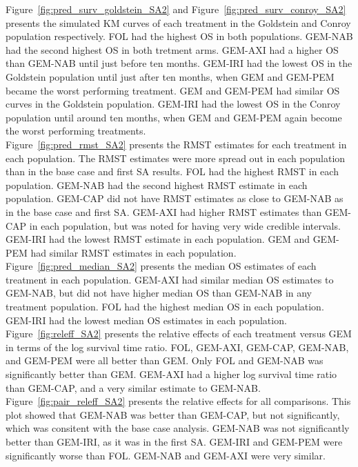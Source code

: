 Figure~\ref{fig:pred_surv_goldstein_SA2} and Figure~\ref{fig:pred_surv_conroy_SA2} presents the simulated KM curves of each treatment in the Goldstein and Conroy population respectively. FOL had the highest OS in both populations. GEM-NAB had the second highest OS in both tretment arms. GEM-AXI had a higher OS than GEM-NAB until just before ten months. GEM-IRI had the lowest OS in the Goldstein population until just after ten months, when GEM and GEM-PEM became the worst performing treatment. GEM and GEM-PEM had similar OS curves in the Goldstein population. GEM-IRI had the lowest OS in the Conroy population until around ten months, when GEM and GEM-PEM again become the worst performing treatments. \\

Figure~\ref{fig:pred_rmst_SA2} presents the RMST estimates for each treatment in each population. The RMST estimates were more spread out in each population than in the base case and first SA results. FOL had the highest RMST in each population. GEM-NAB had the second highest RMST estimate in each population. GEM-CAP did not have RMST estimates as close to GEM-NAB as in the base case and first SA. GEM-AXI had higher RMST estimates than GEM-CAP in each population, but was noted for having very wide credible intervals. GEM-IRI had the lowest RMST estimate in each population. GEM and GEM-PEM had similar RMST estimates in each population. Figure~\ref{fig:pred_median_SA2} presents the median OS estimates of each treatment in each population. GEM-AXI had similar median OS estimates to GEM-NAB, but did not have higher median OS than GEM-NAB in any treatment population. FOL had the highest median OS in each population. GEM-IRI had the lowest median OS estimates in each population. \\

Figure~\ref{fig:releff_SA2} presents the relative effects of each treatment versus GEM in terms of the log survival time ratio. FOL, GEM-AXI, GEM-CAP, GEM-NAB, and GEM-PEM were all better than GEM. Only FOL and GEM-NAB was significantly better than GEM. GEM-AXI had a higher log survival time ratio than GEM-CAP, and a very similar estimate to GEM-NAB. Figure~\ref{fig:pair_releff_SA2} presents the relative effects for all comparisons. This plot showed that GEM-NAB was better than GEM-CAP, but not significantly, which was consitent with the base case analysis. GEM-NAB was not significantly better than GEM-IRI, as it was in the first SA. GEM-IRI and GEM-PEM were significantly worse than FOL. GEM-NAB and GEM-AXI were very similar. \\

